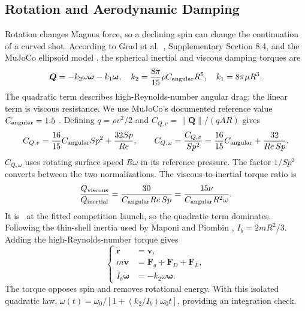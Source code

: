 \documentclass[12pt,letterpaper]{article}
\begin{document}
\subsection{Rotation and Aerodynamic Damping}\label{sec:rotation}
Rotation changes Magnus force, so a declining spin can change the continuation of a curved shot. According to Grad et al.\ \cite{grad2026}, Supplementary Section 8.4, and the MuJoCo ellipsoid model \cite{mujoco381}, the spherical inertial and viscous damping torques are
\begin{equation}
\boldsymbol Q=-k_2\omega\boldsymbol\omega-k_1\boldsymbol\omega,
\quad k_2=\frac{8\pi}{15}\rho C_{\rm angular}R^5,\quad k_1=8\pi\mu R^3.
\label{eq:torque-dimensional}
\end{equation}
The quadratic term describes high-Reynolds-number angular drag; the linear term is viscous resistance. We use MuJoCo's documented reference value $C_{\rm angular}=1.5$ \cite{mujoco381}. Defining $q=\rho v^2/2$ and $C_{Q,v}=\|\boldsymbol Q\|/(qAR)$ gives
\begin{equation}
C_{Q,v}=\frac{16}{15}C_{\rm angular}Sp^2+\frac{32Sp}{Re},\qquad
C_{Q,\omega}=\frac{C_{Q,v}}{Sp^2}=\frac{16}{15}C_{\rm angular}+\frac{32}{Re\,Sp}.
\label{eq:cq-full}
\end{equation}
$C_{Q,\omega}$ uses rotating surface speed $R\omega$ in its reference pressure. The factor $1/Sp^2$ converts between the two normalizations. The viscous-to-inertial torque ratio is
\begin{equation}
\frac{Q_{\rm viscous}}{Q_{\rm inertial}}=
\frac{30}{C_{\rm angular}Re\,Sp}=
\frac{15\nu}{C_{\rm angular}R^2\omega}.
\end{equation}
It is \TorqueViscousRatio\ at the fitted competition launch, so the quadratic term dominates. Following the thin-shell inertia used by Maponi and Piombin \cite{maponi}, $I_b=2mR^2/3$. Adding the high-Reynolds-number torque gives
\begin{equation}
\left\{\begin{aligned}
\dot{\boldsymbol r}&=\boldsymbol v,\\
m\dot{\boldsymbol v}&=\boldsymbol F_g+\boldsymbol F_D+\boldsymbol F_L,\\
I_b\dot{\boldsymbol\omega}&=-k_2\omega\boldsymbol\omega.
\end{aligned}\right.\label{eq:motion-torque}
\end{equation}
The torque opposes spin and removes rotational energy. With this isolated quadratic law, $\omega(t)=\omega_0/[1+(k_2/I_b)\omega_0t]$, providing an integration check.
\end{document}
